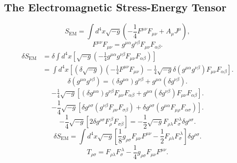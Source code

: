 \documentclass[11pt, a4paper]{report}
\begin{document}
\subsection{The Electromagnetic Stress-Energy Tensor}
\begin{equation}
\label{eq:em_action}
S_{\text{EM}} = \int d^{4}x \sqrt{-g} \left( -\frac{1}{4} F^{\mu\nu}F_{\mu\nu} + A_{\mu}J^{\mu} \right),
\end{equation}
\begin{equation}
F^{\mu\nu}F_{\mu\nu} = g^{\mu\alpha}g^{\nu\beta}F_{\mu\nu}F_{\alpha\beta}.
\end{equation}
\begin{align}
\delta S_{\text{EM}} &= \delta \int d^{4}x \left[ \sqrt{-g} \left( -\frac{1}{4} g^{\mu\alpha}g^{\nu\beta}F_{\mu\nu}F_{\alpha\beta} \right) \right] \nonumber \\
&= \int d^{4}x \left[ (\delta\sqrt{-g})\left(-\frac{1}{4} F^{\mu\nu}F_{\mu\nu}\right) - \frac{1}{4}\sqrt{-g} \delta(g^{\mu\alpha}g^{\nu\beta}) F_{\mu\nu}F_{\alpha\beta} \right].
\end{align}
\begin{equation}
\delta(g^{\mu\alpha}g^{\nu\beta}) = (\delta g^{\mu\alpha})g^{\nu\beta} + g^{\mu\alpha}(\delta g^{\nu\beta}).
\end{equation}
\begin{align}
-\frac{1}{4}\sqrt{-g} \left[ (\delta g^{\mu\alpha})g^{\nu\beta}F_{\mu\nu}F_{\alpha\beta} + g^{\mu\alpha}(\delta g^{\nu\beta})F_{\mu\nu}F_{\alpha\beta} \right].
\end{align}
\begin{equation}
-\frac{1}{4}\sqrt{-g} \left[ \delta g^{\rho\sigma}(g^{\nu\beta}F_{\rho\nu}F_{\sigma\beta}) + \delta g^{\rho\sigma}(g^{\mu\alpha}F_{\mu\rho}F_{\alpha\sigma}) \right].
\end{equation}
\begin{equation}
-\frac{1}{4}\sqrt{-g} \left[ 2 \delta g^{\rho\sigma} F_{\rho}^{\ \beta} F_{\sigma\beta} \right] = -\frac{1}{2}\sqrt{-g} F_{\rho\lambda}F_{\sigma}^{\ \lambda} \delta g^{\rho\sigma}.
\end{equation}
\begin{equation}
\delta S_{\text{EM}} = \int d^{4}x \sqrt{-g} \left[ \frac{1}{8} g_{\rho\sigma} F_{\mu\nu}F^{\mu\nu} - \frac{1}{2} F_{\rho\lambda}F_{\sigma}^{\ \lambda} \right] \delta g^{\rho\sigma}.
\end{equation}
\begin{equation}
\label{eq:em_tensor_derived}
T_{\rho\sigma} = F_{\rho\lambda}F_{\sigma}^{\ \lambda} - \frac{1}{4} g_{\rho\sigma} F_{\mu\nu}F^{\mu\nu}.
\end{equation}
\end{document}
